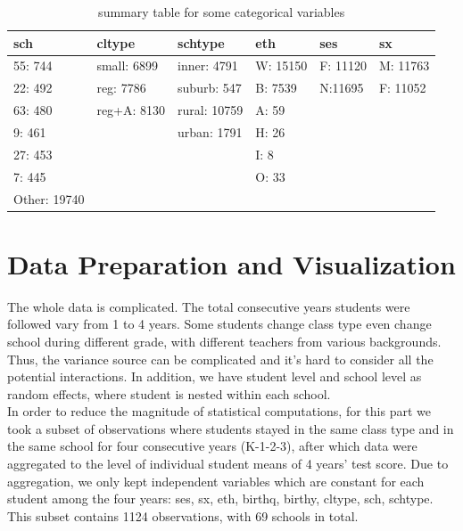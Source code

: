 \documentclass[11pt,a4paper]{article}
\begin{document}
\begin{table}[h]
    \centering
    \caption{summary table for some categorical variables}
    \label{table:categorical variables}
    \begin{tabular}{|l|l|l|l|l|l|}
    \hline
    sch          & cltype      & schtype      & eth      & ses      & sx       \\ \hline
    55: 744      & small: 6899 & inner: 4791  & W: 15150 & F: 11120 & M: 11763 \\ \hline
    22: 492      & reg: 7786   & suburb: 547  & B: 7539  & N:11695  & F: 11052 \\ \hline
    63: 480      & reg+A: 8130 & rural: 10759 & A: 59    &          &          \\ \hline
    9: 461       &             & urban: 1791  & H: 26    &          &          \\ \hline
    27: 453      &             &              & I: 8     &          &          \\ \hline
    7: 445       &             &              & O: 33    &          &          \\ \hline
    Other: 19740 &             &              &          &          &          \\ \hline
    \end{tabular}
\end{table}

\section{Data Preparation and Visualization}

The whole data is complicated. The total consecutive years students were followed vary from 1 to 4 years. 
Some students change class type even change school during different grade, with different teachers from various backgrounds. 
Thus, the variance source can be complicated and it’s hard to consider all the potential interactions. In addition, 
we have student level and school level as random effects, where student is nested within each school. \\

In order to reduce the magnitude of statistical computations, for this part we took a subset of observations where students 
stayed in the same class type and in the same school for four consecutive years (K-1-2-3), after which data were aggregated 
to the level of individual student means of 4 years’ test score. Due to aggregation, we only kept independent variables which 
are constant for each student among the four years: ses, sx, eth, birthq, birthy, cltype, sch, schtype. This subset contains 
1124 observations, with 69 schools in total.\\
\end{document}
